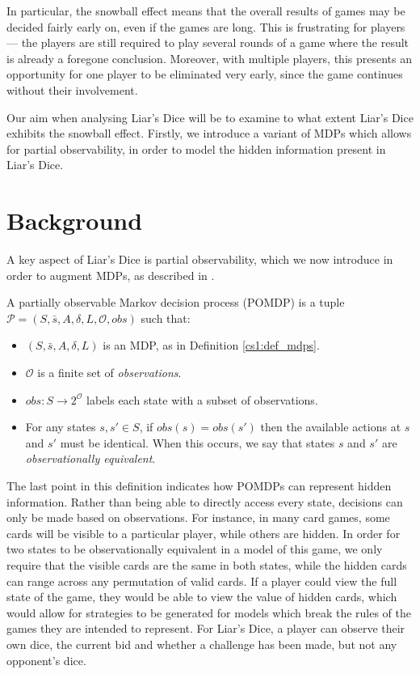 In particular, the snowball effect means that the overall results of games may be decided fairly early on, even if the games are long. This is frustrating for players --- the players are still required to play several rounds of a game where the result is already a foregone conclusion. Moreover, with multiple players, this presents an opportunity for one player to be eliminated very early, since the game continues without their involvement.

Our aim when analysing Liar's Dice will be to examine to what extent Liar's Dice exhibits the snowball effect. Firstly, we introduce a variant of MDPs which allows for partial observability, in order to model the hidden information present in Liar's Dice.

\section{Background}

A key aspect of Liar's Dice is partial observability, which we now introduce in order to augment MDPs, as described in \cite{norman_verification_2017}.

\begin{definition}
    \label{cs2:def-pomdps}

    A partially observable Markov decision process (POMDP) is a tuple $\mathcal{P} = (S, \bar{s}, A, \delta, L, \mathcal{O}, obs)$ such that:

    \begin{itemize}
        \item $(S, \bar{s}, A, \delta, L)$ is an MDP, as in Definition \ref{cs1:def_mdps}.
        \item $\mathcal{O}$ is a finite set of \emph{observations}.
        \item $obs : S \rightarrow 2^{\mathcal{O}}$ labels each state with a subset of observations.
        \item For any states $s, s' \in S$, if $obs(s) = obs(s')$ then the available actions at $s$ and $s'$ must be identical. When this occurs, we say that states $s$ and $s'$ are \emph{observationally equivalent}.
    \end{itemize}
\end{definition}

The last point in this definition indicates how POMDPs can represent hidden information. Rather than being able to directly access every state, decisions can only be made based on observations. For instance, in many card games, some cards will be visible to a particular player, while others are hidden. In order for two states to be observationally equivalent in a model of this game, we only require that the visible cards are the same in both states, while the hidden cards can range across any permutation of valid cards. If a player could view the full state of the game, they would be able to view the value of hidden cards, which would allow for strategies to be generated for models which break the rules of the games they are intended to represent. For Liar's Dice, a player can observe their own dice, the current bid and whether a challenge has been made, but not any opponent's dice.

